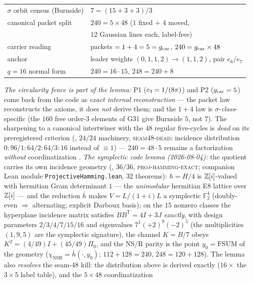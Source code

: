 \begin{keybox}
\begin{center}
\begin{tabular}{ll}
$\sigma$ orbit census (Burnside) & $7=(15+3+3)/3$ \\
canonical packet split & $240=5\times48$ ($1$ fixed $+$ $4$ moved, \\
 & \quad $12$ Gaussian lines each, label-free) \\
carrier reading & packets $=1+4=5=g_{\mathrm{car}}$, $240=g_{\mathrm{car}}\times48$ \\
anchor & leader weights $(0,1,1,2)\to(1,1,2)$, pair $e_6/e_7$ \\
$q=16$ normal form & $240=16\cdot15$, \quad $248=240+8$ \\
\end{tabular}
\end{center}
\emph{The circularity fence is part of the lemma:} P1
($c_3=1/(8\pi)$) and P2 ($g_{\mathrm{car}}=5$) come back from the code as
\emph{exact internal reconstruction} --- the packet law reconstructs
the axioms, it does \emph{not} derive them; and the $1+4$ law is
$\sigma$-\emph{class}-specific (the $160$ free order-$3$ elements of
G31 give Burnside $5$, not $7$).  The sharpening to a canonical
intertwiner with the $48$ regular five-cycles is \emph{dead} on its
preregistered criterion (,
$24/24$ machinery, \textsc{seam48-dead}: incidence distribution
$0{:}96/1{:}64/2{:}64/3{:}16$ instead of $\equiv1$) --- $240=48\cdot5$
remains a factorization \emph{without} coordinatization \mE.
\emph{The symplectic code lemma (2026-08-04):} the quotient carries
its own incidence geometry
(, $36/36$,
\textsc{proj-hamming-exact}; companion Lean module
\texttt{ProjectiveHamming.lean}, $32$ theorems): $h=H/4$ is
$\mathbb{Z}[i]$-valued with hermitian Gram determinant $1$ --- the
\emph{unimodular} hermitian E8 lattice over $\mathbb{Z}[i]$ --- and the
reduction $\bar h$ makes $V=L/(1+i)L$ a symplectic
$\mathbb{F}_2^4$ (doubly-even $\Rightarrow$ alternating; explicit
Darboux basis); on the $15$ nonzero classes the hyperplane
incidence matrix satisfies $BB^{\mathsf T}=4I+3J$ \emph{exactly},
with design parameters $2/3/4/7/15/16$ and eigenvalues
$7^1(+2)^9(-2)^5$ (the multiplicities $(1,9,5)$ are the symplectic
signature), the channel $K=B/7$ obeys
$K^2=(4/49)I+(45/49)\Pi_0$, and the NS/R parity is the point
$y_0=\mathrm{FSUM}$ of the geometry
($\chi_{\mathrm{NSR}}=\bar h(\cdot,y_0)$; $112+128=240$,
$248=120+128$).  The lemma also \emph{resolves} the seam-48 kill:
the distribution above is derived exactly ($16\times$ the
$3\times5$ label table), and the $5\times48$ coordinatization

\end{keybox}
